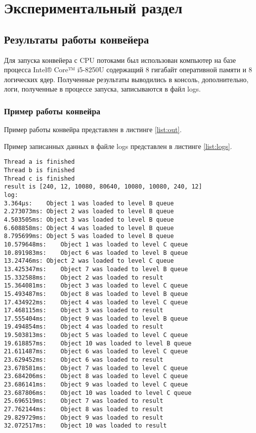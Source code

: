\chapter{ Экспериментальный раздел}
\section{ Результаты работы конвейера}
Для запуска конвейера с CPU потоками был использован компьютер на базе процесса Intel® Core™ i5-8250U содержащий 8 гигабайт оперативной памяти и 8 логических ядер. Полученные результаты выводились в консоль, дополнительно, логи, полученные в процессе запуска, записываются в файл logs.

\subsection{ Пример работы конвейра}

Пример работы конвейра представлен в листинге \ref{list:out}.

Пример записанных данных в файле logs представлен в листинге \ref{list:logs}.

\begin{lstlisting}[caption={ Пример работы конвейера}, label={list:out}]
Thread a is finished
Thread b is finished
Thread c is finished
result is [240, 12, 10080, 80640, 10080, 10080, 240, 12]
log:
3.364µs:	Object 1 was loaded to level B queue
2.273073ms:	Object 2 was loaded to level B queue
4.503505ms:	Object 3 was loaded to level B queue
6.608858ms:	Object 4 was loaded to level B queue
8.795699ms:	Object 5 was loaded to level B queue
10.579648ms:	Object 1 was loaded to level C queue
10.891983ms:	Object 6 was loaded to level B queue
13.24746ms:	Object 2 was loaded to level C queue
13.425347ms:	Object 7 was loaded to level B queue
15.332588ms:	Object 2 was loaded to result
15.364081ms:	Object 3 was loaded to level C queue
15.493487ms:	Object 8 was loaded to level B queue
17.434922ms:	Object 4 was loaded to level C queue
17.468115ms:	Object 3 was loaded to result
17.555404ms:	Object 9 was loaded to level B queue
19.494854ms:	Object 4 was loaded to result
19.503813ms:	Object 5 was loaded to level C queue
19.618857ms:	Object 10 was loaded to level B queue
21.611487ms:	Object 6 was loaded to level C queue
23.629452ms:	Object 6 was loaded to result
23.678581ms:	Object 7 was loaded to level C queue
23.684206ms:	Object 8 was loaded to level C queue
23.686141ms:	Object 9 was loaded to level C queue
23.687806ms:	Object 10 was loaded to level C queue
25.696519ms:	Object 7 was loaded to result
27.762144ms:	Object 8 was loaded to result
29.829729ms:	Object 9 was loaded to result
32.072517ms:	Object 10 was loaded to result
\end{lstlisting}

